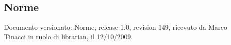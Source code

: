 \subsection{Norme}
Documento versionato: Norme, release 1.0, revision 149, ricevuto da
Marco Tinacci in ruolo di librarian, il 12/10/2009.
